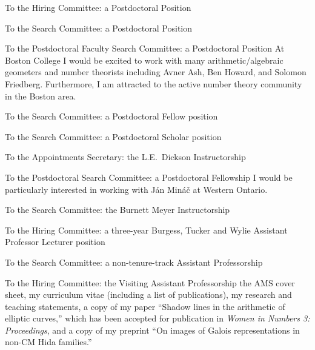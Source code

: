 \documentclass[11pt]{letter}
\begin{document}
\coverletter
  {\lsu}
  {To the Hiring Committee:}
  {a Postdoctoral Position}
  {\mathjobs}
  {}
  {}
  {\generic}

\coverletter
  {\IUPUI}
  {To the Search Committee:}
  {a Postdoctoral Position}
  {\mathjobs}
  {}
  {}
  {\nopublications}

\coverletter
  {\bc}
  {To the Postdoctoral Faculty Search Committee:}
  {a Postdoctoral Position}
  {\mathjobs}
  {At Boston College I would be excited to work with many arithmetic/algebraic geometers and number theorists including Avner Ash, Ben Howard, and Solomon Friedberg.  Furthermore, I am attracted to the active number theory community in the Boston area.}
  {}
  {\generic}

\coverletter
  {\auburn}
  {To the Search Committee:}
  {a Postdoctoral Fellow position}
  {\mathjobs}
  {}
  {}
  {\noteachingnopub}

\coverletter
  {\psu}
  {To the Search Committee:}
  {a Postdoctoral Scholar position}
  {\mathjobs}
  {}
  {}
  {\generic}

\coverletter
  {\chicago}
  {To the Appointments Secretary:}
  {the L.E.~Dickson Instructorship}
  {\mathjobs}
  {}
  {}
  {\genericplusabstract}

\coverletter
  {\uwesternontario}
  {To the Postdoctoral Search Committee:}
  {a Postdoctoral Fellowship}
  {\mathjobs}
  {I would be particularly interested in working with J\'an Min\'a\v{c} at Western Ontario.}
  {}
  {\noteachingnopub}

\coverletter
	{\ucolorado}
	{To the Search Committee:}
	{the Burnett Meyer Instructorship}
	{\mathjobs}
	{}
	{}
	{\nopublications}

\coverletter
  {\uutah}
  {To the Hiring Committee:}
  {a three-year Burgess, Tucker and Wylie Assistant Professor Lecturer position}
  {\mathjobs}
  {}
  {}
  {\generic}

\coverletter
  {\usc}
  {To the Search Committee:}
  {a non-tenure-track Assistant Professorship}
  {\mathjobs}
  {}
  {}
  {\generic}

\coverletter
  {\ucirvine}
  {To the Hiring Committee:}
  {the Visiting Assistant Professorship}
  {\mathjobs}
  {}
  {}
  {the AMS cover sheet, my curriculum vitae (including a list of publications), my research and
  teaching statements, a copy of my paper ``Shadow lines in the arithmetic of elliptic curves,'' which has been accepted for publication in \emph{Women in Numbers 3: Proceedings}, and a copy of my preprint ``On images of Galois representations in non-CM Hida families.''}
\end{document}
